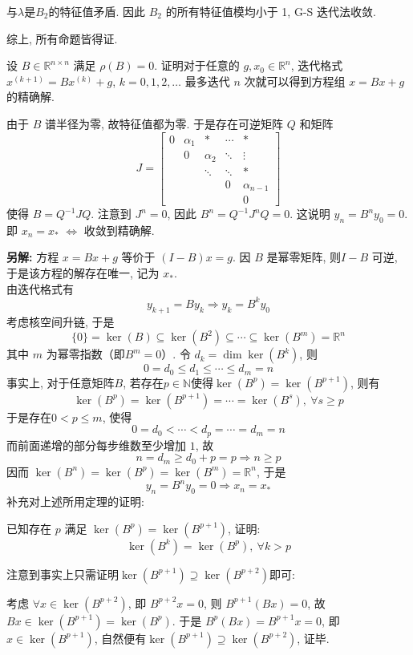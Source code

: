 \documentclass[12pt, answers]{exam}     %
\newcommand{\anothersolution}{\par\noindent\textbf{另解:}}
\newcommand{\R}{\mathbb{R}}
\newcommand{\N}{\mathbb{N}}
\begin{document}
\begin{questions}
\begin{solution}
\begin{enumerate}
    与$\lambda$是$B_2$的特征值矛盾. 因此 \( B_2 \) 的所有特征值模均小于 1, G-S 迭代法收敛. 
\end{enumerate}
综上, 所有命题皆得证. 
\end{solution}

\question{}设 \( B \in \R^{n \times n} \) 满足 \(\rho(B) = 0\). 证明对于任意的 \( g, x_0 \in \R^n \), 
迭代格式 \( x^{(k+1)} = Bx^{(k)} + g \), \( k = 0, 1, 2, \ldots \) 最多迭代 \( n \) 次就可以得到方程组 \( x = Bx + g \) 的精确解. 

\begin{solution}
由于 \( B \) 谱半径为零, 故特征值都为零. 于是存在可逆矩阵 \( Q \) 和矩阵
\[
J =
\begin{bmatrix}
0 & \alpha_1 & * & \cdots & * \\
 & 0 & \alpha_2 & \ddots & \vdots \\
 & & \ddots & \ddots & * \\
 & & & 0 & \alpha_{n-1} \\
 & & & & 0
\end{bmatrix}
\]
使得 \( B = Q^{-1} JQ \). 注意到 \( J^n = 0 \), 因此 \( B^n = Q^{-1} J^nQ = 0 \). 这说明 \( y_n = B^n y_0 = 0 \). \\
即 \( x_n = x_* \) $ \Leftrightarrow$ 收敛到精确解.
\anothersolution{}
方程 $x = Bx + g$ 等价于 $(I - B)x = g$. 因 $B$ 是幂零矩阵, 则$I - B$ 可逆, 于是该方程的解存在唯一, 记为 $x_*$. \\
由迭代格式有
\[
y_{k+1} = B y_k \Rightarrow y_k = B^k y_0 
\]
考虑核空间升链, 于是
\[
\{0\} = \ker(B) \subseteq \ker(B^2) \subseteq \cdots \subseteq \ker(B^m) = \R^n
\]
其中 $m$ 为幂零指数（即$B^m=0$）. 令 $d_k = \dim \ker(B^k)$, 则
\[
0 = d_0 \leq d_1 \leq \cdots \leq d_m = n
\]
事实上, 对于任意矩阵$B$, 若存在$p \in \N$使得$\ker(B^p) = \ker(B^{p+1})$,
则有 \[\ker(B^p) = \ker(B^{p+1}) = \cdots = \ker(B^s), \: \forall s \geq p \]
于是存在$0 < p \leq m$, 使得
\[
0 = d_0 < \cdots < d_p = \cdots = d_m = n
\]
而前面递增的部分每步维数至少增加 $1$, 故
\[
n = d_m \geq d_0 + p = p \Rightarrow n \geq p
\]
因而 $\ker(B^n) = \ker(B^p) = \ker(B^m) = \R^n$, 于是
\[
y_n = B^n y_0 = 0 \Rightarrow x_n = x_*
\]
补充对上述所用定理的证明:

已知存在 \( p \) 满足 \( \ker(B^p) = \ker(B^{p+1}) \), 证明:
\[ \ker(B^k) = \ker(B^p),\: \forall k > p \]

注意到事实上只需证明\( \ker(B^{p+1}) \supseteq \ker(B^{p+2}) \)即可:

考虑 \( \forall x \in \ker(B^{p+2}) \), 即 \( B^{p+2}x = 0 \), 则 \( B^{p+1}(Bx) = 0 \), 故 \( Bx \in \ker(B^{p+1}) = \ker(B^p) \). 于是 \( B^p(Bx) = B^{p+1}x = 0 \), 即 \( x \in \ker(B^{p+1}) \), 自然便有$ \ker(B^{p+1}) \supseteq \ker(B^{p+2}) $, 证毕.
\end{solution}



\end{questions}
\end{document}

